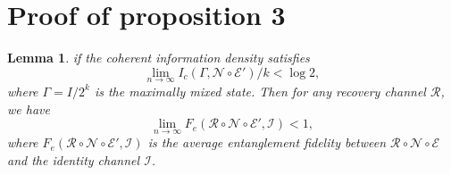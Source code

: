 \documentclass[twoside,english,aps,showpacs,pra,superscriptaddress]{revtex4-2}
\newtheorem{lemma}{Lemma}
\begin{document}
\section{Proof of proposition 3}
\begin{lemma}
    if the coherent information density satisfies
    \begin{equation}
        \lim_{n\rightarrow \infty} I_c(\Gamma, \mathcal{N} \circ \mathcal{E}')/k < \log 2,
    \end{equation}
    where $\Gamma = I/2^k$ is the maximally mixed state. Then for any recovery channel $\mathcal{R}$, we have
    \begin{equation}
        \lim_{n\rightarrow \infty} F_e(\mathcal{R\circ N \circ E', I}) < 1,
    \end{equation}
    where $F_e(\mathcal{R\circ N \circ E', I})$ is the average entanglement fidelity between $\mathcal{R\circ N \circ E}$ and the identity channel $\mathcal{I}$.
\end{lemma}
\end{document}
